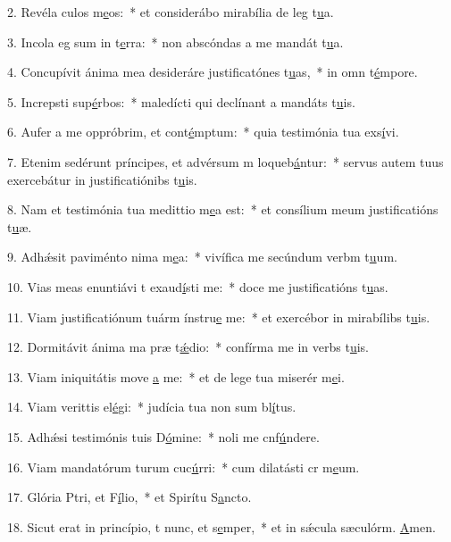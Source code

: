 2. Revéla culos m\uline{e}os:~* et considerábo mirabília de leg t\uline{u}a.\par 
3. Incola eg sum in t\uline{e}rra:~* non abscóndas a me mandát t\uline{u}a.\par 
4. Concupívit ánima mea desideráre justificatónes t\uline{u}as,~* in omn t\uline{é}mpore.\par 
5. Increpsti sup\uline{é}rbos:~* maledícti qui declínant a mandáts t\uline{u}is.\par 
6. Aufer a me oppróbrim, et cont\uline{é}mptum:~* quia testimónia tua exs\uline{í}vi.\par 
7. Etenim sedérunt príncipes, et advérsum m loqueb\uline{á}ntur:~* servus autem tuus exercebátur in justificatiónibs t\uline{u}is.\par 
8. Nam et testimónia tua medittio m\uline{e}a est:~* et consílium meum justificatións t\uline{u}æ.\par 
9. Adhǽsit paviménto nima m\uline{e}a:~* vivífica me secúndum verbm t\uline{u}um.\par 
10. Vias meas enuntiávi t exaud\uline{í}sti me:~* doce me justificatións t\uline{u}as.\par 
11. Viam justificatiónum tuárm ínstru\uline{e} me:~* et exercébor in mirabílibs t\uline{u}is.\par 
12. Dormitávit ánima ma præ t\uline{ǽ}dio:~* confírma me in verbs t\uline{u}is.\par 
13. Viam iniquitátis move \uline{a} me:~* et de lege tua miserér m\uline{e}i.\par 
14. Viam verittis el\uline{é}gi:~* judícia tua non sum bl\uline{í}tus.\par 
15. Adhǽsi testimónis tuis D\uline{ó}mine:~* noli me cnf\uline{ú}ndere.\par 
16. Viam mandatórum turum cuc\uline{ú}rri:~* cum dilatásti cr m\uline{e}um.\par 
17. Glória Ptri, et F\uline{í}lio,~* et Spirítu S\uline{a}ncto.\par 
18. Sicut erat in princípio, t nunc, et s\uline{e}mper,~* et in sǽcula sæculórm. \uline{A}men.\par 
